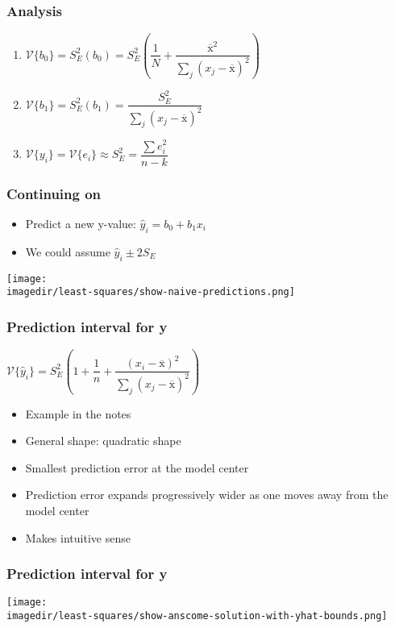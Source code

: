 \begin{frame}\frametitle{Analysis}
	\begin{enumerate}
		\item	$\mathcal{V}\{b_0\} = S_E^2(b_0) = S_E^2 \left(\dfrac{1}{N} + \dfrac{\overline{\mathrm{x}}^2}{\sum_j{\left( x_j - \overline{\mathrm{x}} \right)^2}} \right)$ 
		\item	$\mathcal{V}\{b_1\} = S_E^2(b_1) = \dfrac{S_E^2}{\sum_j{\left( x_j - \overline{\mathrm{x}} \right)^2}}$ 
		\item	$\mathcal{V}\{y_i\} = \mathcal{V}\{e_i\} \approx S_E^2 = \dfrac{\sum{e_i^2}}{n-k}$ 
	\end{enumerate}
\end{frame}

\begin{frame}\frametitle{Continuing on}
	\begin{itemize}
		\item	Predict a new y-value: $\hat{y}_i = b_0 + b_1 x_i$ 
		\item	We could assume $\hat{y}_i \pm 2S_E$ 
	\end{itemize}
	\begin{center}
		\texttt{[image: \\imagedir/least-squares/show-naive-predictions.png]}
	\end{center}
\end{frame}

\begin{frame}\frametitle{Prediction interval for y}
	
	$\mathcal{V}\{\hat{y}_i\} = S_E^2 \left(1 + \dfrac{1}{n} + \dfrac{(x_i - \overline{\mathrm{x}})^2}{\sum_j{\left( x_j - \overline{\mathrm{x}} \right)^2}}\right)$
	\begin{itemize}
		\item	Example in the notes 
		\item	General shape: quadratic shape 
		\item	Smallest prediction error at the model center 
		\item	Prediction error expands progressively wider as one moves away from the model center 
		\item	Makes intuitive sense 
	\end{itemize}
\end{frame}

\begin{frame}\frametitle{Prediction interval for y}
	\begin{center}
		\texttt{[image: \\imagedir/least-squares/show-anscome-solution-with-yhat-bounds.png]}
	\end{center}
\end{frame}

